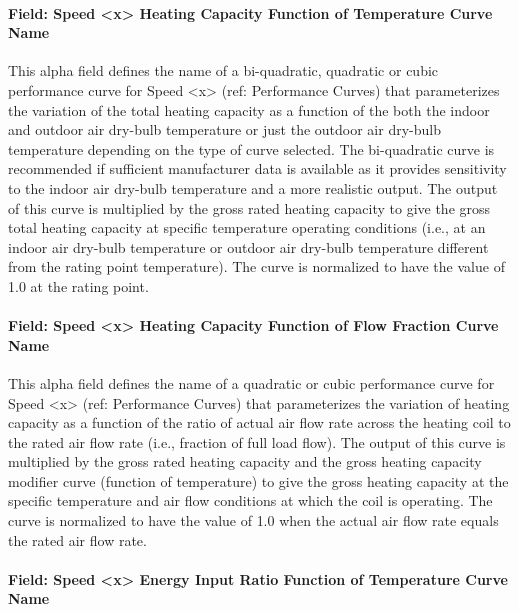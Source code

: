 \paragraph{Field: Speed \textless{}x\textgreater{} Heating Capacity Function of Temperature Curve Name}\label{field-speed-x-heating-capacity-function-of-temperature-curve-name}

This alpha field defines the name of a bi-quadratic, quadratic or cubic performance curve for Speed \textless{}x\textgreater{} (ref: Performance Curves) that parameterizes the variation of the total heating capacity as a function of the both the indoor and outdoor air dry-bulb temperature or just the outdoor air dry-bulb temperature depending on the type of curve selected. The bi-quadratic curve is recommended if sufficient manufacturer data is available as it provides sensitivity to the indoor air dry-bulb temperature and a more realistic output. The output of this curve is multiplied by the gross rated heating capacity to give the gross total heating capacity at specific temperature operating conditions (i.e., at an indoor air dry-bulb temperature or outdoor air dry-bulb temperature different from the rating point temperature). The curve is normalized to have the value of 1.0 at the rating point.

\paragraph{Field: Speed \textless{}x\textgreater{} Heating Capacity Function of Flow Fraction Curve Name}\label{field-speed-x-heating-capacity-function-of-flow-fraction-curve-name}

This alpha field defines the name of a quadratic or cubic performance curve for Speed \textless{}x\textgreater{} (ref: Performance Curves) that parameterizes the variation of heating capacity as a function of the ratio of actual air flow rate across the heating coil to the rated air flow rate (i.e., fraction of full load flow). The output of this curve is multiplied by the gross rated heating capacity and the gross heating capacity modifier curve (function of temperature) to give the gross heating capacity at the specific temperature and air flow conditions at which the coil is operating. The curve is normalized to have the value of 1.0 when the actual air flow rate equals the rated air flow rate.

\paragraph{Field: Speed \textless{}x\textgreater{} Energy Input Ratio Function of Temperature Curve Name}\label{field-speed-x-energy-input-ratio-function-of-temperature-curve-name-2}

